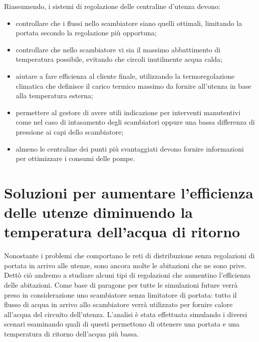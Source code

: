 \documentclass[laurea,oneside,11pt]{USiena_tesiLM}
\begin{document}
Riassumendo, i sistemi di regolazione delle centraline d'utenza devono:
\begin{itemize}
\item controllare che i flussi nello scambiatore siano quelli ottimali, limitando la portata secondo la regolazione più opportuna;
\item controllare che nello scambiatore vi sia il massimo abbattimento di temperatura possibile, evitando che circoli inutilmente acqua calda;
\item aiutare a fare efficienza al cliente finale, utilizzando la termoregolazione climatica che definisce il carico termico massimo da fornire all'utenza in base alla temperatura esterna;
\item permettere al gestore di avere utili indicazione per interventi manutentivi come nel caso di intasamento degli scambiatori oppure una bassa differenza di pressione ai capi dello scambiatore;
\item almeno le centraline dei punti più svantaggiati devono fornire informazioni per ottimizzare i consumi delle pompe.
\end{itemize}

\section{Soluzioni per aumentare l'efficienza delle utenze diminuendo la temperatura dell'acqua di ritorno}
Nonostante i problemi che comportano le reti di distribuzione senza regolazioni di portata in arrivo alle utenze, sono ancora molte le abitazioni che ne sono prive.
Dettò ciò andremo a studiare alcuni tipi di regolazioni che aumentino l'efficienza delle abitazioni. 
Come base di paragone per tutte le simulazioni future verrà preso in considerazione uno scambiatore senza limitatore di portata: tutto il flusso di acqua in arrivo allo scambiatore verrà utilizzato per fornire calore all'acqua del circuito dell'utenza. 
L'analisi è stata effettuata  simulando i diversi scenari esaminando quali di questi permettono di ottenere una portata e una temperatura di ritorno dell'acqua più bassa.
\end{document}
